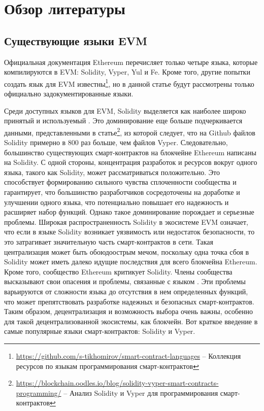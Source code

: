 \chapter{Обзор литературы}
\label{chap:lr}

\section{Существующие языки EVM}
\label{sec:langs}
Официальная документация Ethereum \cite{OfficialEthereumLanguages} перечисляет только четыре языка, которые компилируются в EVM: Solidity, Vyper, Yul и Fe. Кроме того, другие попытки создать язык для EVM известны\footnote{\href{https://github.com/s-tikhomirov/smart-contract-languages}{https://github.com/s-tikhomirov/smart-contract-languages} -- Коллекция ресурсов по языкам программирования смарт-контрактов}, но в данной статье будут рассмотрены только официально задокументированные языки.



Среди доступных языков для EVM, Solidity выделяется как наиболее широко принятый и используемый \cite{SolidityWidelyUsed, SolidityDevsChallenges}. Это доминирование еще больше подчеркивается данными, представленными в статье\footnote{\href{https://blockchain.oodles.io/blog/solidity-vyper-smart-contracts-programming/}{https://blockchain.oodles.io/blog/solidity-vyper-smart-contracts-programming/} -- Анализ Solidity и Vyper для программирования смарт-контрактов}, из которой следует, что на Github файлов Solidity примерно в 800 раз больше, чем файлов Vyper. Следовательно, большинство существующих смарт-контрактов на блокчейне Ethereum написаны на Solidity. С одной стороны, концентрация разработок и ресурсов вокруг одного языка, такого как Solidity, может рассматриваться положительно. Это способствует формированию сильного чувства сплоченности сообщества и гарантирует, что большинство разработчиков сосредоточены на доработке и улучшении одного языка, что потенциально повышает его надежность и расширяет набор функций. Однако такое доминирование порождает и серьезные проблемы. Широкая распространенность Solidity в экосистеме EVM означает, что если в языке Solidity возникает уязвимость или недостаток безопасности, то это затрагивает значительную часть смарт-контрактов в сети. Такая централизация может быть обоюдоострым мечом, поскольку одна точка сбоя в Solidity может иметь далеко идущие последствия для всего блокчейна Ethereum. Кроме того, сообщество Ethereum критикует Solidity. Члены сообщества высказывают свои опасения и проблемы, связанные с языком \cite{SolidityDevsChallenges}. Эти проблемы варьируются от сложности языка до отсутствия в нем определенных функций, что может препятствовать разработке надежных и безопасных смарт-контрактов. Таким образом, децентрализация и возможность выбора очень важны, особенно для такой децентрализованной экосистемы, как блокчейн. Вот краткое введение в самые популярные языки смарт-контрактов: Solidity и Vyper.

